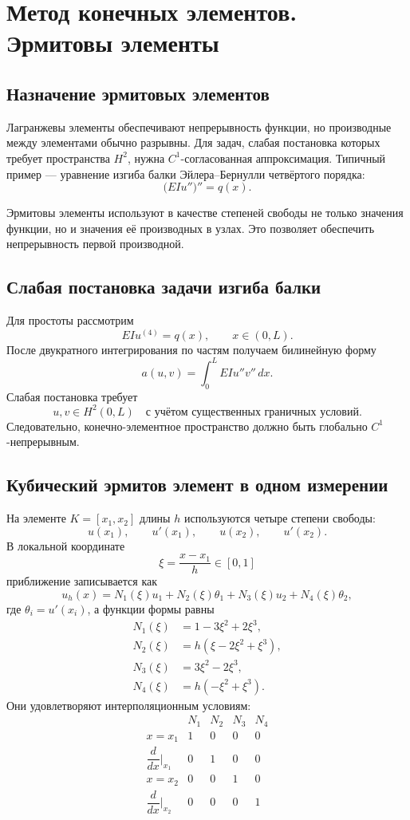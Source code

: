 \section{Метод конечных элементов. Эрмитовы элементы}
\label{sec:fem-hermite}

\subsection{Назначение эрмитовых элементов}

Лагранжевы элементы обеспечивают непрерывность функции, но производные между
элементами обычно разрывны. Для задач, слабая постановка которых требует
пространства $H^2$, нужна $C^1$-согласованная аппроксимация. Типичный пример ---
уравнение изгиба балки Эйлера--Бернулли четвёртого порядка:
\[
    \bigl(EIu''\bigr)''=q(x).
\]

Эрмитовы элементы используют в качестве степеней свободы не только значения
функции, но и значения её производных в узлах. Это позволяет обеспечить
непрерывность первой производной.

\subsection{Слабая постановка задачи изгиба балки}

Для простоты рассмотрим
\[
    EIu^{(4)}=q(x),
    \qquad x\in(0,L).
\]
После двукратного интегрирования по частям получаем билинейную форму
\[
    a(u,v)=\int_0^L EIu''v''\,dx.
\]
Слабая постановка требует
\[
    u,v\in H^2(0,L)
    \quad\text{с учётом существенных граничных условий}.
\]
Следовательно, конечно-элементное пространство должно быть глобально
$C^1$-непрерывным.

\subsection{Кубический эрмитов элемент в одном измерении}

На элементе $K=[x_1,x_2]$ длины $h$ используются четыре степени свободы:
\[
    u(x_1),\qquad u'(x_1),\qquad u(x_2),\qquad u'(x_2).
\]
В локальной координате
\[
    \xi=\frac{x-x_1}{h}\in[0,1]
\]
приближение записывается как
\[
    u_h(x)=
    N_1(\xi)u_1+N_2(\xi)\theta_1+
    N_3(\xi)u_2+N_4(\xi)\theta_2,
\]
где $\theta_i=u'(x_i)$, а функции формы равны
\[
\begin{aligned}
N_1(\xi)&=1-3\xi^2+2\xi^3,\\
N_2(\xi)&=h(\xi-2\xi^2+\xi^3),\\
N_3(\xi)&=3\xi^2-2\xi^3,\\
N_4(\xi)&=h(-\xi^2+\xi^3).
\end{aligned}
\]
Они удовлетворяют интерполяционным условиям:
\[
\begin{array}{c|cccc}
&N_1&N_2&N_3&N_4\\ \hline
x=x_1&1&0&0&0\\
\dfrac{d}{dx}\big|_{x_1}&0&1&0&0\\
x=x_2&0&0&1&0\\
\dfrac{d}{dx}\big|_{x_2}&0&0&0&1
\end{array}
\]

